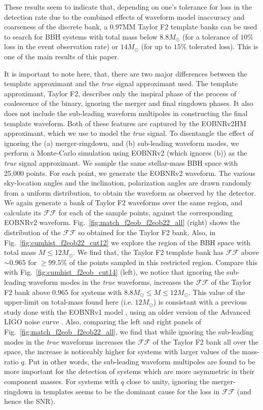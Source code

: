 \documentclass[aps,
prd,
amsmath,
amssymb,
twocolumn,
floatfix,
groupedaddress]{revtex4-1}
\newcommand{\FF}{\mathcal{FF}}
\newcommand{\MM}{\mathrm{MM}}
\begin{document}
These results seem to indicate that, depending on one's tolerance for loss in the detection rate due to the combined effects of waveform model inaccuracy and coarseness of the discrete bank, a $0.97\MM$ Taylor F2 template banks can be used to search for BBH systems with total mass below $8.8M_{\odot}$ (for a tolerance of $10\%$ loss in the event observation rate) or $14M_{\odot}$ (for up to $15\%$ tolerated loss). This is one of the main results of this paper.

It is important to note here, that, there are two major differences between the template approximant and the \textit{true} signal approximant used. The template approximant, Taylor F2, describes only the inspiral phase of the process of coalescence of the binary, ignoring the merger and final ringdown phases. It also does not include the sub-leading waveform multipoles in constructing the final template waveform. Both of these features are captured by the EOBNRv2HM approximant, which we use to model the \textit{true} signal. To disentangle the effect of ignoring the (a) merger-ringdown, and (b) sub-leading waveform modes, we perform a Monte-Carlo simulation using EOBNRv2 (which ignores (b)) as the \textit{true} signal approximant. We sample the same stellar-mass BBH space with 25,000 points. For each point, we generate the EOBNRv2 waveform. The various sky-location angles and the inclination, polarization angles are drawn randomly from a uniform distribution, to obtain the waveform as observed by the 
detector. We again generate a bank of Taylor F2 waveforms over the same region, and calculate its $\FF$ for each of the sample points, against the corresponding EOBNRv2 waveform. Fig.~\ref{fig:match_f2eob_f2eob22_all} (right) shows the distribution of the $\FF$ so obtained for the Taylor F2 bank. Also, in Fig.~\ref{fig:cumhist_f2eob22_cut12} we explore the region of the BBH space with total mass $M\leq 12M_{\odot}$. We find that, the Taylor F2 template bank has $\FF$ above $\sim 0.965$ for $\geq 99.5\%$ of the points sampled in this restricted region. Compare this with Fig.~\ref{fig:cumhist_f2eob_cut14} (left), we notice that ignoring the sub-leading waveform modes in the \textit{true} waveforms, increases the $\FF$ of the Taylor F2 bank above $0.965$ for systems with $8.8M_{\odot}\leq M\leq 12M_{\odot}$. This value of the upper-limit on total-mass found here (i.e. $12M_{\odot}$) is consistant with a previous study \citep{CompTemplates2009} done with the EOBNRv1 model \citep{Buonanno:2007pf}, using an older version of the Advanced LIGO noise curve \citep{CompTemplates2009}. Also, comparing the left and right panels of Fig.~\ref{fig:match_f2eob_f2eob22_all}, we find that while ignoring the sub-leading modes in the \textit{true} waveforms increases the $\FF$ of the Taylor F2 bank all 
over the space, the increase is noticeably higher for systems with larger values of the mass-ratio $q$. Put in other words, the sub-leading waveform multipoles are found to be more important for the detection of systems which are more asymmetric in their component masses. For systems with $q$ close to unity, ignoring the merger-ringdown in templates seems to be the dominant cause for the loss in $\FF$ (and hence the SNR).
\end{document}
